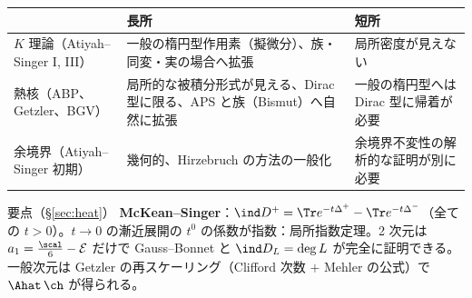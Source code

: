 \begin{rem}[3 つの証明の比較]\label{rem:threeproofs}
\begin{center}
{\small\begin{tabular}{p{2.6cm}|p{5cm}|p{5cm}}
\toprule
 & 長所 & 短所\\
\midrule
$K$ 理論（Atiyah--Singer I, III）& 一般の楕円型作用素（擬微分）、族・同変・実の場合へ拡張 & 局所密度が見えない\\
熱核（ABP、Getzler、BGV）& 局所的な被積分形式が見える、Dirac 型に限る、APS と族（Bismut）へ自然に拡張 & 一般の楕円型へは Dirac 型に帰着が必要\\
余境界（Atiyah--Singer 初期）& 幾何的、Hirzebruch の方法の一般化 & 余境界不変性の解析的な証明が別に必要\\
\bottomrule
\end{tabular}}
\end{center}
\end{rem}
\begin{keybox}{要点（\S\ref{sec:heat}）}
\textbf{McKean--Singer}：$\ind D^+=\Tr e^{-t\Delta^+}-\Tr e^{-t\Delta^-}$（全ての $t>0$）。$t\to0$ の漸近展開の $t^0$ の係数が指数：局所指数定理。2 次元は $a_1=\frac{\scal}6-\mathcal E$ だけで Gauss--Bonnet と $\ind D_L=\deg L$ が完全に証明できる。一般次元は Getzler の再スケーリング（Clifford 次数 $+$ Mehler の公式）で $\Ahat\,\ch$ が得られる。
\end{keybox}
